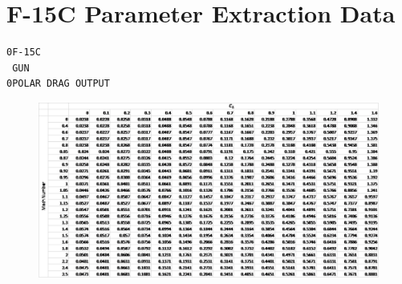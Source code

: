\chapter{F-15C Parameter Extraction Data}
\renewcommand\thesection{\Alpha {A}}

\label{section:dragpolar}
\label{app: polar}
\begin{verbatim}
0F-15C                               
 GUN                                      
0POLAR DRAG OUTPUT
\end{verbatim}
\begin{figure}[H]
    \centering
    \includegraphics[width = 15cm]{Thesis/Appendices/Drag_Polar_Example.png}
\end{figure}

